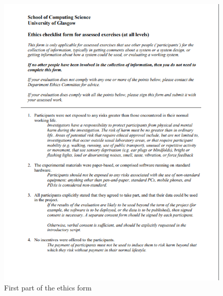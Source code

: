 \documentclass{dissertation}
\begin{document}
\begin{appendices}
\begin{figure}[H]
\centering
\includegraphics[width = 13cm]{images/signed-form1.png}
\caption{First part of the ethics form}
\label{fig:e1}
\end{figure}


\end{appendices}
\end{document}
